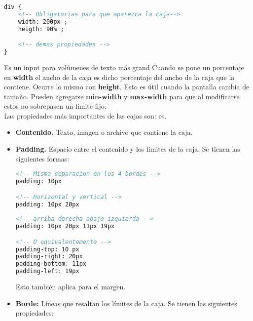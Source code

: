 \documentclass[10pt,oneside]{article}
\begin{document}
\begin{multicols}{2}
    \begin{lstlisting}[language=HTML]
div {
    <!-- Obligatorias para que aparezca la caja-->
    width: 200px ;
    heigth: 90% ; 

    <!-- demas propiedades -->
}
    \end{lstlisting}
    
   Es un input para volúmenes de texto más grand Cuando se pone un porcentaje en \textbf{width} el ancho de la caja es dicho porcentaje del ancho de la caja que la contiene. Ocurre lo mismo con \textbf{height}. Esto es útil cuando la pantalla cambia de tamaño. Pueden agregarse \textbf{min-width} y \textbf{max-width} para que al modificarse estos no sobrepasen un límite fijo.\\\newline  Las propiedades más importantes de las cajas son: es.
    
       \begin{itemize}
        \item \textbf{Contenido.} Texto, imagen o archivo que contiene la caja.
        \item \textbf{Padding.} Espacio entre el contenido y los límites de la caja. Se tienen las siguientes formas:

        \begin{lstlisting}[language=HTML]
<!-- Misma separacion en los 4 bordes -->
padding: 10px

<!-- Horizontal y vertical -->
padding: 10px 20px
            
<!-- arriba derecha abajo izquierda -->
padding: 10px 20px 11px 19px

<!-- O equivalentemente -->
padding-top: 10 px
padding-right: 20px
padding-bottom: 11px
padding-left: 19px
        \end{lstlisting}

        Esto también aplica para el margen.
        
        \item \textbf{Borde:} Líneas que resaltan los límites de la caja. Se tienen las siguientes propiedades:


\end{itemize}
\end{multicols}
\end{document}
